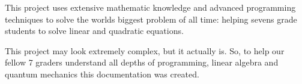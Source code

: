 This project uses extensive mathematic knowledge and advanced programming techniques to solve the world\textquotesingle{}s biggest problem of all time\+: helping seven\textquotesingle{}s grade students to solve linear and quadratic equations.

This project may look extremely complex, but it actually is. So, to help our fellow 7 graders understand all depths of programming, linear algebra and quantum mechanics this documentation was created. 